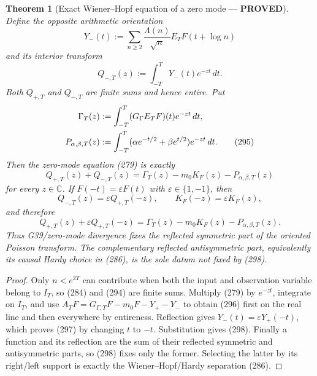\documentclass[11pt]{article}
\newtheorem{theorem}{Theorem}
\newcommand{\PROVED}{\textcolor{green!45!black}{\textbf{PROVED}}}
\begin{document}
\begin{theorem}[Exact Wiener--Hopf equation of a zero mode --- \PROVED]
Define the opposite arithmetic orientation
\begin{equation}
 Y_-(t):=\sum_{n\ge2}\frac{\Lambda(n)}{\sqrt n}
                    E_TF(t+\log n)                   \tag{293}
\end{equation}
and its interior transform
\begin{equation}
 Q_{-,T}(z):=\int_{-T}^{T}Y_-(t)e^{-zt}\,dt.          \tag{294}
\end{equation}
Both $Q_{+,T}$ and $Q_{-,T}$ are finite sums and hence entire.  Put
\begin{align}
 \Gamma_T(z)&:=\int_{-T}^{T}(G_\Gamma E_TF)(t)e^{-zt}\,dt,\notag\\
 P_{\alpha,\beta,T}(z)&:=\int_{-T}^{T}
   (\alpha e^{-t/2}+\beta e^{t/2})e^{-zt}\,dt.        \tag{295}
\end{align}
Then the zero-mode equation (279) is exactly
\begin{equation}
 \boxed{
 Q_{+,T}(z)+Q_{-,T}(z)
 =\Gamma_T(z)-m_0K_F(z)-P_{\alpha,\beta,T}(z)}        \tag{296}
\end{equation}
for every $z\in\mathbb C$.  If $F(-t)=\varepsilon F(t)$ with
$\varepsilon\in\{1,-1\}$, then
\begin{equation}
 Q_{-,T}(z)=\varepsilon Q_{+,T}(-z),
 \qquad K_F(-z)=\varepsilon K_F(z),                  \tag{297}
\end{equation}
and therefore
\begin{equation}
 Q_{+,T}(z)+\varepsilon Q_{+,T}(-z)
 =\Gamma_T(z)-m_0K_F(z)-P_{\alpha,\beta,T}(z).       \tag{298}
\end{equation}
Thus G39/zero-mode divergence fixes the reflected symmetric part of the
oriented Poisson transform.  The complementary reflected antisymmetric
part, equivalently its causal Hardy choice in (286), is the sole datum not
fixed by (298).
\end{theorem}

\begin{proof}
Only $n<e^{2T}$ can contribute when both the input and observation variable
belong to $I_T$, so (284) and (294) are finite sums.  Multiply (279) by
$e^{-zt}$, integrate on $I_T$, and use
$A_TF=G_{\Gamma,T}F-m_0F-Y_+-Y_-$ to obtain (296) first on the real line
and then everywhere by entireness.  Reflection gives
$Y_-(t)=\varepsilon Y_+(-t)$, which proves (297) by changing $t$ to $-t$.
Substitution gives (298).  Finally a function and its reflection are the
sum of their reflected symmetric and antisymmetric parts, so (298) fixes
only the former.  Selecting the latter by its right/left support is exactly
the Wiener--Hopf/Hardy separation (286).
\end{proof}
\end{document}
